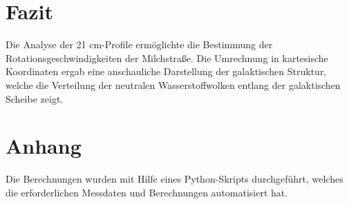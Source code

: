 \documentclass[a4paper,12pt]{article}
\begin{document}
\section*{Fazit}
Die Analyse der 21 cm-Profile ermöglichte die Bestimmung der Rotationsgeschwindigkeiten der Milchstraße. Die Umrechnung in kartesische Koordinaten ergab eine anschauliche Darstellung der galaktischen Struktur, welche die Verteilung der neutralen Wasserstoffwolken entlang der galaktischen Scheibe zeigt.
\section*{Anhang}
Die Berechnungen wurden mit Hilfe eines Python-Skripts durchgeführt, welches die erforderlichen Messdaten und Berechnungen automatisiert hat.
\end{document}

